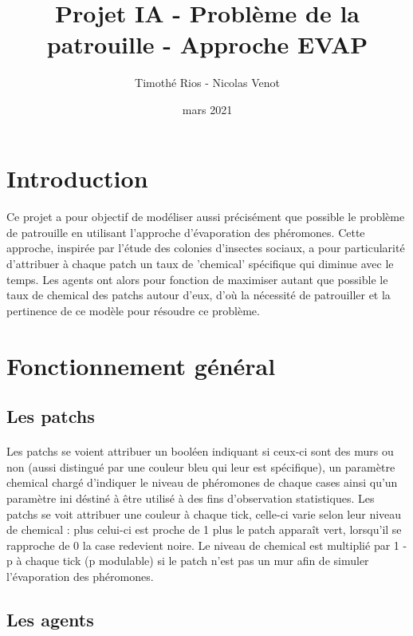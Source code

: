 \documentclass{article}
\title{Projet IA - Probl\`eme de la patrouille - Approche EVAP}
\author{Timoth\'e Rios - Nicolas Venot}
\date{mars 2021}
\begin{document}
\maketitle
\newpage
\tableofcontents
\newpage
\setlength{\parindent}{0pt}
\section*{Introduction}
\paragraph{}Ce projet a pour objectif de mod\'eliser aussi pr\'ecis\'ement que possible le probl\`eme de patrouille en utilisant l'approche d'\'evaporation des ph\'eromones.
Cette approche, inspir\'ee par l'\'etude des colonies d'insectes sociaux, a pour particularit\'e d'attribuer \`a chaque patch un taux de 'chemical' sp\'ecifique qui diminue avec le temps.
Les agents ont alors pour fonction de maximiser autant que possible le taux de chemical des patchs autour d'eux, d'o\`u la n\'ecessit\'e de patrouiller et la pertinence de ce mod\`ele pour r\'esoudre ce probl\`eme.
\section{Fonctionnement g\'en\'eral}
    \subsection{Les patchs}
\paragraph{}Les patchs se voient attribuer un bool\'een indiquant si ceux-ci sont des murs ou non (aussi distingu\'e par une couleur bleu qui leur est sp\'ecifique), un param\`etre chemical charg\'e d'indiquer le niveau de ph\'eromones de chaque cases ainsi qu'un param\`etre ini d\'estin\'e \`a \^etre utilis\'e \`a des fins d'observation statistiques.
Les patchs se voit attribuer une couleur \`a chaque tick, celle-ci varie selon leur niveau de chemical :
plus celui-ci est proche de 1 plus le patch appara\^it vert, lorsqu'il se rapproche de 0 la case redevient noire. Le niveau de chemical est multipli\'e par 1 - p \`a chaque tick (p modulable) si le patch n'est pas un mur afin de simuler l'\'evaporation des ph\'eromones.
      
    \subsection{Les agents}
\end{document}
